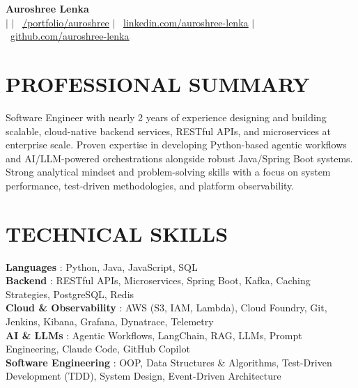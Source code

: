 \documentclass[a4paper,11pt]{article}
\begin{document}
\begin{center}
    \textbf{\Huge Auroshree Lenka} \\ \vspace{5pt}
    {\setlength{\baselineskip}{16pt}
    \small {} \hspace{1pt} $|$
    \hspace{1pt} \faEnvelope \hspace{2pt}{aurolenka2001@gmail.com} \hspace{1pt} $|$ 
    \hspace{1pt} \faGlobe~\href{https://auroshree-lenka.vercel.app}{\underline{/portfolio/auroshree}} \hspace{1pt} $|$
    \hspace{1pt} \faLinkedin~\href{https://linkedin.com/in/auroshree-lenka}{\underline{linkedin.com/auroshree-lenka}} $|$
    \hspace{1pt} \faGithub~\href{https://github.com/Alexwolf21}{\underline{github.com/auroshree-lenka}}
    }
    \\ \vspace{-3pt}
\end{center}

\section{PROFESSIONAL SUMMARY}
 Software Engineer with nearly 2 years of experience designing and building scalable, cloud-native backend services, RESTful APIs, and microservices at enterprise scale. Proven expertise in developing Python-based agentic workflows and AI/LLM-powered orchestrations alongside robust Java/Spring Boot systems. Strong analytical mindset and problem-solving skills with a focus on system performance, test-driven methodologies, and platform observability.

\section{TECHNICAL SKILLS}
 \begin{itemize}[leftmargin=0in, label={}]
    \small{\item{
     \textbf{Languages} {: Python, Java, JavaScript, SQL}\vspace{2pt} \\
     \textbf{Backend} {: RESTful APIs, Microservices, Spring Boot, Kafka, Caching Strategies, PostgreSQL, Redis} \vspace{2pt} \\
     \textbf{Cloud \& Observability} {: AWS (S3, IAM, Lambda), Cloud Foundry, Git, Jenkins, Kibana, Grafana, Dynatrace, Telemetry}\vspace{2pt} \\
     \textbf{AI \& LLMs} {: Agentic Workflows, LangChain, RAG, LLMs, Prompt Engineering, Claude Code, GitHub Copilot} \vspace{2pt} \\
     \textbf{Software Engineering} {: OOP, Data Structures \& Algorithms, Test-Driven Development (TDD), System Design, Event-Driven Architecture} 
    }}
 \end{itemize}
\end{document}
